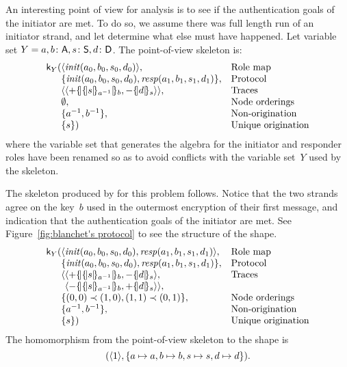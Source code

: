 \documentclass[12pt]{report}
\theoremstyle{definition}
\newcommand{\skel}{\mathsf{k}}
\newcommand{\init}{\fn{init}}
\newcommand{\resp}{\fn{resp}}
\begin{document}
An interesting point of view for analysis is to see if the
authentication goals of the initiator are met.  To do so, we assume
there was full length run of an initiator strand, and let {\cpsa}
determine what else must have happened.  Let variable set $Y=a,b\colon
\mathsf{A},s\colon\mathsf{S}, d\colon\mathsf{D}$.  The point-of-view skeleton is:
$$\begin{array}{r@{}ll}
\skel_Y(
&\seq{\init(a_0,b_0,s_0,d_0)},
&\mbox{Role map}\\
&\{\init(a_0,b_0,s_0,d_0),\resp(a_1,b_1,s_1,d_1)\},
&\mbox{Protocol}\\
&\seq{\seq{\outbnd\enc{\enc{s}{a^{-1}}}{b},\inbnd\enc{d}{s}}},
&\mbox{Traces}\\
&\emptyset,
&\mbox{Node orderings}\\
&\{a^{-1},b^{-1}\},
&\mbox{Non-origination}\\
&\{s\})
&\mbox{Unique origination}
\end{array}$$
where the variable set that generates the algebra for the initiator
and responder roles have been renamed so as to avoid conflicts with
the variable set~$Y$ used by the skeleton.

The skeleton produced by {\cpsa} for this problem follows.  Notice
that the two strands agree on the key~$b$ used in the outermost
encryption of their first message, and indication that the
authentication goals of the initiator are met.  See
Figure~\ref{fig:blanchet's protocol} to see the structure of the shape.
$$\begin{array}{r@{}ll}
\skel_Y(
&\seq{\init(a_0,b_0,s_0,d_0),\resp(a_1,b_1,s_1,d_1)},
&\mbox{Role map}\\
&\{\init(a_0,b_0,s_0,d_0),\resp(a_1,b_1,s_1,d_1)\},
&\mbox{Protocol}\\
&\langle\begin{array}[t]{@{}l}
\seq{\outbnd\enc{\enc{s}{a^{-1}}}{b},\inbnd\enc{d}{s}},\\
\seq{\inbnd\enc{\enc{s}{a^{-1}}}{b},\outbnd\enc{d}{s}}\rangle,
\end{array}
&\mbox{Traces}\\
&\{(0,0)\prec(1,0),(1,1)\prec(0,1)\},
&\mbox{Node orderings}\\
&\{a^{-1},b^{-1}\},
&\mbox{Non-origination}\\
&\{s\})
&\mbox{Unique origination}
\end{array}$$
The homomorphism from the point-of-view skeleton to the shape is
$$(\langle1\rangle,\{a\mapsto a, b\mapsto b, s\mapsto s, d\mapsto d\}).$$
\end{document}
